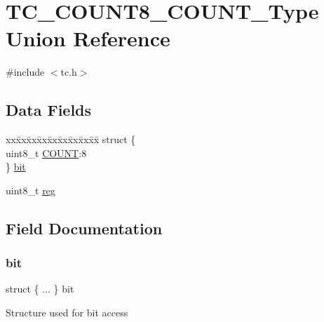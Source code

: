 \hypertarget{union_t_c___c_o_u_n_t8___c_o_u_n_t___type}{}\section{T\+C\+\_\+\+C\+O\+U\+N\+T8\+\_\+\+C\+O\+U\+N\+T\+\_\+\+Type Union Reference}
\label{union_t_c___c_o_u_n_t8___c_o_u_n_t___type}


{\ttfamily \#include $<$tc.\+h$>$}

\subsection*{Data Fields}
\begin{DoxyCompactItemize}
\item 
\begin{tabbing}
xx\=xx\=xx\=xx\=xx\=xx\=xx\=xx\=xx\=\kill
struct \{\\
\>uint8\_t \mbox{\hyperlink{union_t_c___c_o_u_n_t8___c_o_u_n_t___type_a372acb47c2518e8c684cb757b2e5d791}{COUNT}}:8\\
\} \mbox{\hyperlink{union_t_c___c_o_u_n_t8___c_o_u_n_t___type_a073544682ee0293f6a838a8b4e40e8c7}{bit}}\\

\end{tabbing}\item 
uint8\+\_\+t \mbox{\hyperlink{union_t_c___c_o_u_n_t8___c_o_u_n_t___type_a9428adc9af4653a2050e2536b55dec8d}{reg}}
\end{DoxyCompactItemize}


\subsection{Field Documentation}
\mbox{\label{union_t_c___c_o_u_n_t8___c_o_u_n_t___type_a073544682ee0293f6a838a8b4e40e8c7}} 
\subsubsection{\texorpdfstring{bit}{bit}}
{\footnotesize\ttfamily struct \{ ... \}   bit}

Structure used for bit access \mbox{\label{union_t_c___c_o_u_n_t8___c_o_u_n_t___type_a372acb47c2518e8c684cb757b2e5d791}} 
